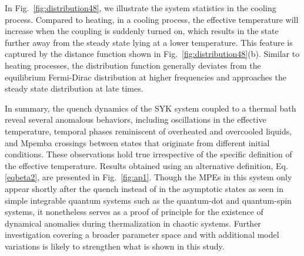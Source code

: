 In Fig.~\ref{fig:distribution48}, we illustrate the system statistics in the cooling process. Compared to heating, in a cooling process, the effective temperature will increase when the coupling is suddenly turned on, which results in the state further away from the steady state lying at a lower temperature. This feature is captured by the distance function shown in Fig.~\ref{fig:distribution48}(b). Similar to heating processes, the distribution function generally deviates from the equilibrium Fermi-Dirac distribution at higher frequencies and approaches the steady state distribution at late times.

In summary, the quench dynamics of the SYK system coupled to a thermal bath reveal several anomalous behaviors, including oscillations in the effective temperature, temporal phases reminiscent of overheated and overcooled liquids, and Mpemba crossings between states that originate from different initial conditions. These observations hold true irrespective of the specific definition of the effective temperature. Results obtained using an alternative definition, Eq.\eqref{eqbeta2}, are presented in Fig.~\ref{fig:ap1}. Though the MPEs in this system only appear shortly after the quench instead of in the asymptotic states as seen in simple integrable quantum systems such as the quantum-dot and quantum-spin systems, it nonetheless serves as a proof of principle for the existence of dynamical anomalies during thermalization in chaotic systems. Further investigation covering a broader parameter space and with additional model variations is likely to strengthen what is shown in this study.




